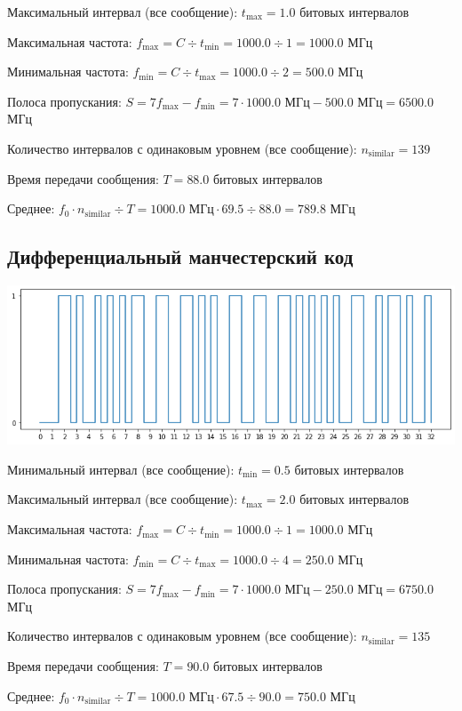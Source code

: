 Максимальный интервал (все сообщение): $t_\mathrm{max}=1.0$ битовых интервалов

Максимальная частота: $f_\mathrm{max}=C\div t_\mathrm{min}=1000.0\div 1=1000.0$ МГц

Минимальная частота: $f_\mathrm{min}=C\div t_\mathrm{max}=1000.0\div 2=500.0$ МГц

Полоса пропускания: $S=7f_\mathrm{max}-f_\mathrm{min} = 7\cdot 1000.0\text{ МГц}-500.0\text{ МГц}=6500.0$ МГц

Количество интервалов с одинаковым уровнем (все сообщение): $n_\mathrm{similar}=139$

Время передачи сообщения: $T=88.0$ битовых интервалов

Среднее: $f_0\cdot n_\mathrm{similar}\div T=1000.0\text{ МГц}\cdot 69.5\div 88.0=789.8$ МГц

\subsection{Дифференциальный манчестерский код}
\includegraphics[width=\textwidth]{1manchester_diff}

Минимальный интервал (все сообщение): $t_\mathrm{min}=0.5$ битовых интервалов

Максимальный интервал (все сообщение): $t_\mathrm{max}=2.0$ битовых интервалов

Максимальная частота: $f_\mathrm{max}=C\div t_\mathrm{min}=1000.0\div 1=1000.0$ МГц

Минимальная частота: $f_\mathrm{min}=C\div t_\mathrm{max}=1000.0\div 4=250.0$ МГц

Полоса пропускания: $S=7f_\mathrm{max}-f_\mathrm{min} = 7\cdot 1000.0\text{ МГц}-250.0\text{ МГц}=6750.0$ МГц

Количество интервалов с одинаковым уровнем (все сообщение): $n_\mathrm{similar}=135$

Время передачи сообщения: $T=90.0$ битовых интервалов

Среднее: $f_0\cdot n_\mathrm{similar}\div T=1000.0\text{ МГц}\cdot 67.5\div 90.0=750.0$ МГц

